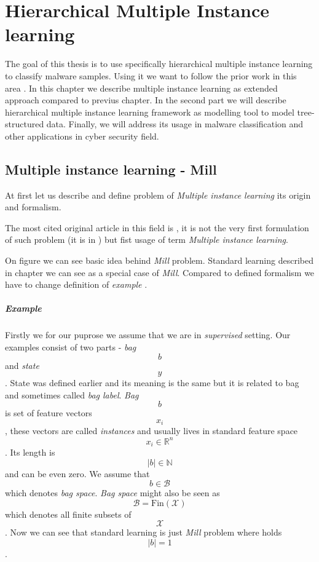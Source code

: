 \chapter{Hierarchical Multiple Instance learning} \label{chap:hmill}
The goal of this thesis is to use specifically hierarchical multiple instance learning to classify malware samples. Using it we want to follow the prior work in this area \cite{Mandlik2020}.
In this chapter we describe multiple instance learning as extended approach compared to previus chapter. In the second part we will describe hierarchical multiple instance learning framework as modelling tool to model tree-structured data. Finally, we will address its usage in malware classification and other applications in cyber security field.

\section{Multiple instance learning - Mill}
At first let us describe and define problem of \emph{Multiple instance learning} its origin and formalism.

The most cited original article in this field is \citet{Dietterich1997}, it is not the very first formulation of such problem (it is in \cite{Keeler1991}) but fist usage of term \emph{Multiple instance learning}.

On figure  we can see basic idea behind \emph{Mill} problem. Standard learning described in chapter  we can see as a special case of \emph{Mill}. Compared to defined formalism we have to change definition of \emph{example} . 
\paragraph{Example}
Firstly we for our puprose we assume that we are in \emph{supervised} setting. Our examples consist of two parts - \emph{bag} $$b$$ and \emph{state} $$y$$. State was defined earlier and its meaning is the same but it is related to bag and sometimes called \emph{bag label}. \emph{Bag} $$b$$ is set of feature vectors $$x_i$$, these vectors are called \emph{instances} and usually lives in standard feature space $$x_i \in \mathbb{R}^{n}$$. Its length is $$|b| \in \mathbb{N}$$ and can be even zero. We assume that $$b \in \mathcal{B}$$ which denotes \emph{bag space}. \emph{Bag space} might also be seen as $$\mathcal{B} = \mathrm{Fin}(\mathcal{X})$$ which denotes all finite subsets of $$\mathcal{X}$$. Now we can see that standard learning is just \emph{Mill} problem where holds $$|b| = 1$$.


